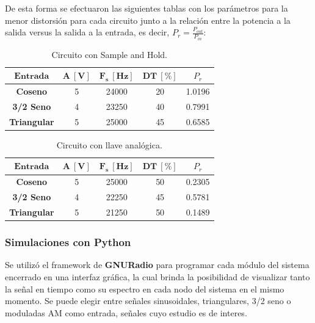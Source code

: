 De esta forma se efectuaron las siguientes tablas con los parámetros para la menor distorsión para cada circuito junto a la relación entre la potencia a la salida versus la salida a la entrada, es decir, $P_r = \frac{P_{out}}{P_{in}}$:
\begin{multicols}{2}
\begin{table}[H]
\centering
\begin{tabular}{ccccc}
\hline
$\mathbf{Entrada}$  & $\mathbf{A \ [V]}$ & $\mathbf{F_s \ [Hz]}$ & $\mathbf{DT \ [\%]}$ & $P_r$\\ \hline
\textbf{Coseno}     & 5                 & 24000                 & 20         &      1.0196     \\
\textbf{3/2 Seno}   & 4                & 23250                 & 40           &    0.7991     \\
\textbf{Triangular} & 5                  & 25000                 & 45          &       0.6585 	\\ \hline
\end{tabular}
\caption{Circuito con Sample and Hold.}
\label{tab:res1}
\end{table}
\begin{table}[H]
\centering
\begin{tabular}{ccccc}
\hline
$\mathbf{Entrada}$  & $\mathbf{A \ [V]}$ & $\mathbf{F_s \ [Hz]}$ & $\mathbf{DT \ [\%]}$ &$P_r$ \\ \hline
\textbf{Coseno}     & 5                  & 25000                 & 50       &     0.2305       \\
\textbf{3/2 Seno}   & 4                  & 22250                 & 45        &      0.5781     \\
\textbf{Triangular} & 5                  & 21250                 & 50         &    0.1489      \\ \hline
\end{tabular}
\caption{Circuito con llave analógica.}
\label{tab:res2}
\end{table}
\end{multicols}


\subsubsection{Simulaciones con Python}
Se utilizó el framework de \textbf{GNURadio} para programar cada módulo del sistema encerrado en una interfaz gráfica, la cual brinda la posibilidad de visualizar tanto la señal en tiempo como su espectro en cada nodo del sistema en el mismo momento. Se puede elegir entre señales sinusoidales, triangulares, 3/2 seno o moduladas AM como entrada, señales cuyo estudio es de interes.

